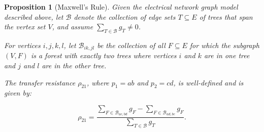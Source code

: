 \documentclass[12pt]{article}
\newtheorem{proposition}[theorem]{Proposition}
\theoremstyle{definition}
\begin{document}
\begin{proposition}[Maxwell's Rule]
\label{Maxwell1}
Given the electrical network graph model described above, let
$\mathcal{B}$ denote the collection of edge sets 
$T\subseteq E$ of trees that span the vertex set $V$, and assume 
$\sum_{T\in \mathcal{B}}g_T\neq 0$.

For vertices $i,j,k,l$, 
let $\mathcal{B}_{ik,jl}$ be the collection 
of all $F\subseteq E$
for which
the subgraph $(V,F)$ is a forest
with exactly two trees where vertices
$i$ and $k$ are in one tree and 
$j$ and $l$ are in the other tree.

The transfer resistance $\rho_{21}$, where $p_1=ab$ and 
$p_2=cd$, is well-defined and is given by:

\begin{equation}
\label{Maxwell1equation2port}
\rho_{21}=\frac{\sum_{F\in \mathcal{B}_{ac,bd}}g_F -
                  \sum_{F\in \mathcal{B}_{ad,bc}}g_F}
                 {\sum_{T\in \mathcal{B}}g_T}.
\end{equation}
\end{proposition}
\end{document}
